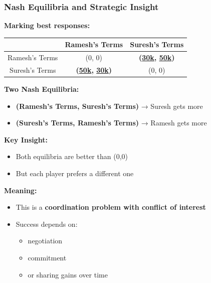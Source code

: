 \begin{frame}[fragile]\frametitle{Nash Equilibria and Strategic Insight}

\textbf{Marking best responses:}

\begin{center}
\begin{tabular}{|c|c|c|}
  \hline
  & Ramesh's Terms & Suresh's Terms \\
  \hline
  Ramesh's Terms & (0, 0) & \textbf{(\underline{30k}, \underline{50k})} \\
  \hline
  Suresh's Terms & \textbf{(\underline{50k}, \underline{30k})} & (0, 0) \\
  \hline
\end{tabular}
\end{center}

\vspace{6pt}

\textbf{Two Nash Equilibria:}
\begin{itemize}
  \item \textbf{(Ramesh's Terms, Suresh's Terms)} → Suresh gets more
  \item \textbf{(Suresh's Terms, Ramesh's Terms)} → Ramesh gets more
\end{itemize}

\vspace{6pt}

\textbf{Key Insight:}

\begin{itemize}
  \item Both equilibria are better than (0,0)
  \item But each player prefers a different one
\end{itemize}

\vspace{6pt}

\textbf{Meaning:}
\begin{itemize}
  \item This is a \textbf{coordination problem with conflict of interest}
  \item Success depends on:
  \begin{itemize}
    \item negotiation
    \item commitment
    \item or sharing gains over time
  \end{itemize}
\end{itemize}

\end{frame}


